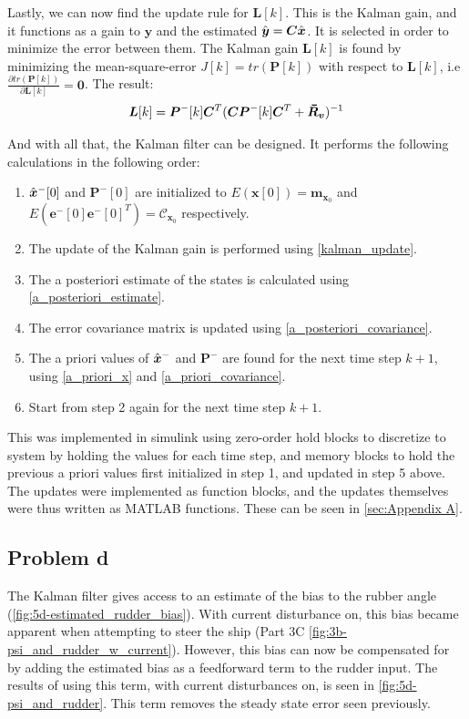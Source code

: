 Lastly, we can now find the update rule for $\bm{L}[k]$. This is the Kalman gain, and it functions as a gain to $\bm{y}$ and the estimated $\hat{\bm{y}} = \bm{C}\hat{\bm{x}}$. It is selected in order to minimize the error between them. The Kalman gain $\bm{L}[k]$ is found by minimizing the mean-square-error $J[k] = tr(\bm{P}[k])$ with respect to $\bm{L}[k]$, i.e $\frac{\partial tr(\bm{P}[k])}{\partial\bm{L}[k]} = \bm{0}$. The result:
\begin{equation}
\bm{L}[k] = \bm{P}^-[k]\bm{C}^T(\bm{CP}^-[k]\bm{C}^T+\bmbar{R}_{\bm{v}})^{-1} \label{kalman_update}
\end{equation}

And with all that, the Kalman filter can be designed. It performs the following calculations in the following order:
\begin{enumerate}
 \item $\hat{\bm{x}}^-[0]$ and $\bm{P}^-[0]$ are initialized to $E(\bm{x}[0]) = \bm{m}_{\bm{x}_0}$ and $E(\bm{e}^-[0]\bm{e}^-[0]^T) = \mathcal{C}_{\bm{x}_0}$ respectively.
 \item The update of the Kalman gain is performed using  \cref{kalman_update}.
 \item The a posteriori estimate of the states is calculated using  \cref{a_posteriori_estimate}.
 \item The error covariance matrix is updated using  \cref{a_posteriori_covariance}.
 \item The a priori values of $\hat{\bm{x}}^-$ and $\bm{P}^-$ are found for the next time step $k+1$, using \cref{a_priori_x} and \cref{a_priori_covariance}.
 \item Start from step 2 again for the next time step $k+1$.
\end{enumerate}

This was implemented in simulink using zero-order hold blocks to discretize to system by holding the values for each time step, and memory blocks to hold the previous a priori values first initialized in step 1, and updated in step 5 above. The updates were implemented as function blocks, and the updates themselves were thus written as MATLAB functions. These can be seen in \cref{sec:Appendix A}.

\subsection{Problem d}
The Kalman filter gives access to an estimate of the bias to the rubber angle (\cref{fig:5d-estimated_rudder_bias}).  With current disturbance on, this bias became apparent when attempting to steer the ship (Part 3C \cref{fig:3b-psi_and_rudder_w_current}).  However, this bias can now be compensated for by adding the estimated bias as a feedforward term to the rudder input.  The results of using this term, with current disturbances on, is seen in \cref{fig:5d-psi_and_rudder}.  This term removes the steady state error seen previously.

